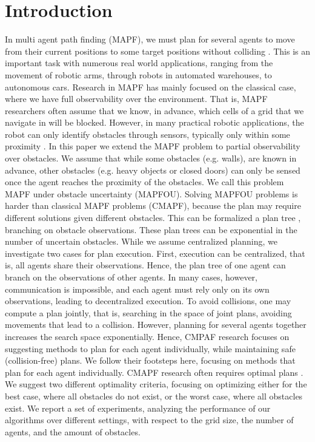 \documentclass[letterpaper]{article} %
\begin{document}
\section{Introduction}
In multi agent path finding (MAPF), we must plan for several agents to move from their current positions to some target positions without colliding \cite{stern2019multi}. This is an important task with numerous real world applications, ranging from the movement of robotic arms, through robots in automated warehouses, to autonomous cars.
Research in MAPF has mainly focused on the classical case, where we have full observability over the environment. That is, MAPF researchers often assume that we know, in advance, which cells of a grid that we navigate in will be blocked. However, in many practical robotic applications, the robot can only identify obstacles through sensors, typically only within some proximity \cite{lenser2003visual}.
In this paper we extend the MAPF problem to partial observability over obstacles. We assume that while some obstacles (e.g. walls), are known in advance, other obstacles (e.g. heavy objects or closed doors) can only be sensed once the agent reaches the proximity of the obstacles. We call this problem MAPF under obstacle uncertainty (MAPFOU).
Solving MAPFOU problems is harder than classical MAPF problems (CMAPF), because the plan may require different solutions given different obstacles. This can be formalized a  plan tree \cite{hoffmann2005contingent}, branching on obstacle observations. These plan trees can be exponential in the number of uncertain obstacles.
While we assume centralized planning, we investigate two cases for plan execution. First, execution can be centralized, that is, all agents share their observations. Hence, the plan tree of one agent can branch on the observations of other agents. In many cases, however, communication is impossible, and each agent must rely only on its own observations, leading to decentralized execution.
To avoid collisions, one may compute a plan jointly, that is, searching in the space of joint plans, avoiding movements that lead to a collision. However, planning for several agents together increases the search space exponentially. Hence, CMPAF research focuses on suggesting methods to plan for each agent individually, while maintaining safe (collision-free) plans. We follow their footsteps here, focusing on methods that plan for each agent individually.
CMAPF research often requires optimal plans \cite{stern2019multi}. We suggest two different optimality criteria, focusing on optimizing either for the best case, where all obstacles do not exist, or the worst case, where all obstacles exist.
We report a set of experiments, analyzing the performance of our algorithms over different settings, with respect to the grid size, the number of agents, and the amount of obstacles.
\end{document}
